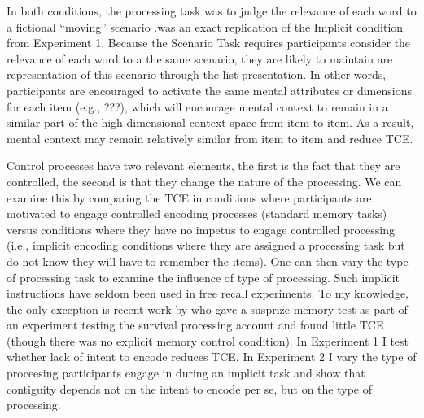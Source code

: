 
 In both conditions, the processing task was to judge the relevance of each word to a fictional ``moving'' scenario \citep{NairEtal16}.was an exact replication of the Implicit condition from Experiment 1. Because the Scenario Task requires participants consider the relevance of each word to a the same scenario, they are likely to maintain are representation of this scenario through the list presentation. In other words, participants are encouraged to activate the same mental attributes or dimensions for each item (e.g., ???), which will encourage mental context to remain in a similar part of the high-dimensional context space from item to item. As a result, mental context may remain relatively similar from item to item and reduce TCE. 












 Control processes have two relevant elements, the first is the fact that they are controlled, the second is that they change the nature of the processing. We can examine this by comparing the TCE in conditions where participants are motivated to engage controlled encoding processes (standard memory tasks) versus conditions where they have no impetus to engage controlled processing (i.e., implicit encoding conditions where they are assigned a processing task but do not know they will have to remember the items). One can then vary the type of processing task to examine the influence of type of processing. Such implicit instructions have seldom been used in free recall experiments. To my knowledge, the only exception is recent work by \citet{NairEtal16} who gave a susprize memory test as part of an experiment testing the survival processing account and found little TCE (though there was no explicit memory control condition). In Experiment 1 I test whether lack of intent to encode reduces TCE. In Experiment 2 I vary the type of proceesing participants engage in during an implicit task and show that contiguity depends not on the intent to encode per se, but on the type of processing.










